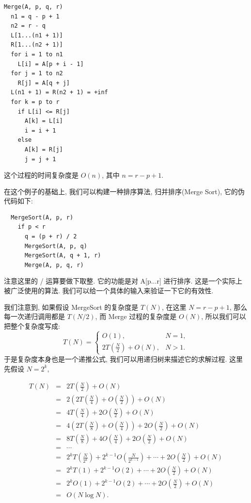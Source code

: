 \documentclass[a4paper]{ctexart}
\theoremstyle{definition}
\theoremstyle{definition}
\begin{document}
\begin{verbatim}
Merge(A, p, q, r)
  n1 = q - p + 1
  n2 = r - q 
  L[1...(n1 + 1)]
  R[1...(n2 + 1)]
  for i = 1 to n1
    L[i] = A[p + i - 1]
  for j = 1 to n2
    R[j] = A[q + j]
  L(n1 + 1) = R(n2 + 1) = +inf
  for k = p to r
    if L[i] <= R[j]
      A[k] = L[i]
      i = i + 1
    else
      A[k] = R[j]
      j = j + 1
\end{verbatim}    

这个过程的时间复杂度是 $O(n)$, 其中 $n = r - p + 1$.

在这个例子的基础上, 我们可以构建一种排序算法, 归并排序(Merge Sort), 它的伪代码如下:
\begin{verbatim}
  MergeSort(A, p, r)
    if p < r
      q = (p + r) / 2
      MergeSort(A, p, q)
      MergeSort(A, q + 1, r)
      Merge(A, p, q, r)
\end{verbatim}
注意这里的 / 运算要做下取整. 它的功能是对 A[p...r] 进行排序. 这是一个实际上被广泛使用的算法. 
我们可以给一个具体的输入来验证一下它的有效性.

我们注意到, 如果假设 MergeSort 的复杂度是 $T(N)$, 在这里 $N = r - p + 1$, 
那么每一次递归调用都是 $T(N / 2)$, 而 Merge 过程的复杂度是 $O(N)$, 所以我们可以把整个复杂度写成:
\begin{equation}
  T(N) = \left\{
    \begin{array}{ll}
      O(1), & N = 1, \\
      2 T(\frac{N}{2}) + O(N), & N > 1.
    \end{array}
  \right.
\end{equation}
于是复杂度本身也是一个递推公式, 我们可以用递归树来描述它的求解过程. 这里先假设 $N = 2^k$,

\begin{eqnarray*}
T(N) &=& 2 T(\frac{N}{2}) + O(N) \\
&=& 2(2 T(\frac{N}{4}) + O(\frac{N}{2})) + O(N) \\
&=& 4 T(\frac{N}{4}) + 2 O(\frac{N}{2}) + O(N) \\
&=& 4(2 T(\frac{N}{8}) + O(\frac{N}{4})) + 2 O(\frac{N}{2}) + O(N) \\
&=& 8 T(\frac{N}{8}) + 4 O(\frac{N}{4}) + 2 O(\frac{N}{2}) + O(N) \\
&=& \cdots \\
&=& 2^k T(\frac{N}{2^k}) + 2^{k - 1} O(\frac{N}{2^{k - 1}}) + \cdots + 2 O(\frac{N}{2}) + O(N) \\
&=& 2^k T(1) + 2^{k - 1} O(2) + \cdots + 2 O(\frac{N}{2}) + O(N) \\
&=& 2^k O(1) + 2^{k - 1} O(2) + \cdots + 2 O(\frac{N}{2}) + O(N) \\
&=& O(N \log N).
\end{eqnarray*}
\end{document}
